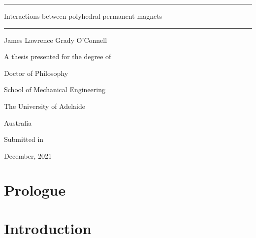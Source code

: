\documentclass[11pt,a4paper,twoside]{book}
\makeatletter
\newcommand*{\currentname}{\TR@currentTitle}
\makeatother
\begin{document}

\begin{titlepage}    
    \begin{flushright}   
        \vspace*{2cm}
        \Huge
        \hrule
        \vspace*{2mm}
        Interactions between polyhedral permanent magnets
        \vspace*{2mm}
        \hrule
        
        \vspace{1cm}
        \LARGE
        James Lawrence Grady O'Connell
        
        \vspace{2.5cm}
        \Large
        A thesis presented for the degree of
        
        \LARGE
        Doctor of Philosophy
        
        \vspace{3cm}
        \large
        School of Mechanical Engineering
        
        The University of Adelaide
        
        Australia
        
        \vspace{1cm}
        Submitted in
        
        December, 2021
    \end{flushright}
\end{titlepage}



\renewcommand{\cftchapfont}{\normalfont \scshape}
\makeatletter
    \renewcommand{\@tocrmarg}{5em plus1fil}
\makeatother
\tableofcontents

\pagestyle{fancy}
\fancyhead[RO]{\scshape \nouppercase \currentname}
\fancyhead[LE]{}
\fancyhead[LO,RE]{}
\fancyfoot[LE,RO]{\thepage}
\fancyfoot[CE,CO]{}
\chapter*{Prologue}\label{chap:prologue}

\chapter{Introduction}\label{chap:introduction}

\end{document}
